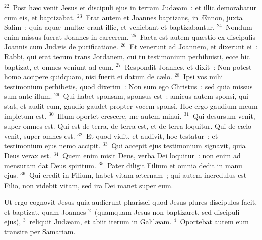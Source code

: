 ${}^{22}$~Post h\ae c venit Jesus et discipuli ejus in terram Jud\ae am~: et illic demorabatur cum eis, et baptizabat.
${}^{23}$~Erat autem et Joannes baptizans, in \AE nnon, juxta Salim~: quia aqu\ae\ mult\ae\ erant illic, et veniebant et baptizabantur.
${}^{24}$~Nondum enim missus fuerat Joannes in carcerem.
${}^{25}$~Facta est autem qu\ae stio ex discipulis Joannis cum Jud\ae is de purificatione.
${}^{26}$~Et venerunt ad Joannem, et dixerunt ei~: Rabbi, qui erat tecum trans Jordanem, cui tu testimonium perhibuisti, ecce hic baptizat, et omnes veniunt ad eum.
${}^{27}$~Respondit Joannes, et dixit~: Non potest homo accipere quidquam, nisi fuerit ei datum de c\ae lo.
${}^{28}$~Ipsi vos mihi testimonium perhibetis, quod dixerim~: Non sum ego Christus~: sed quia missus sum ante illum.
${}^{29}$~Qui habet sponsam, sponsus est~: amicus autem sponsi, qui stat, et audit eum, gaudio gaudet propter vocem sponsi. Hoc ergo gaudium meum impletum est.
${}^{30}$~Illum oportet crescere, me autem minui.
${}^{31}$~Qui desursum venit, super omnes est. Qui est de terra, de terra est, et de terra loquitur. Qui de c\ae lo venit, super omnes est.
${}^{32}$~Et quod vidit, et audivit, hoc testatur~: et testimonium ejus nemo accipit.
${}^{33}$~Qui accepit ejus testimonium signavit, quia Deus verax est.
${}^{34}$~Quem enim misit Deus, verba Dei loquitur~: non enim ad mensuram dat Deus spiritum.
${}^{35}$~Pater diligit Filium et omnia dedit in manu ejus.
${}^{36}$~Qui credit in Filium, habet vitam \ae ternam~; qui autem incredulus est Filio, non videbit vitam, sed ira Dei manet super eum.

\lettrine[lines=3,image=true,loversize=0.05,lraise=-0.03]{U}{}t ergo cognovit Jesus quia audierunt pharis\ae i quod Jesus plures discipulos facit, et baptizat, quam Joannes
${}^{2}$~(quamquam Jesus non baptizaret, sed discipuli ejus),
${}^{3}$~reliquit Jud\ae am, et abiit iterum in Galil\ae am.
${}^{4}$~Oportebat autem eum transire per Samariam.



